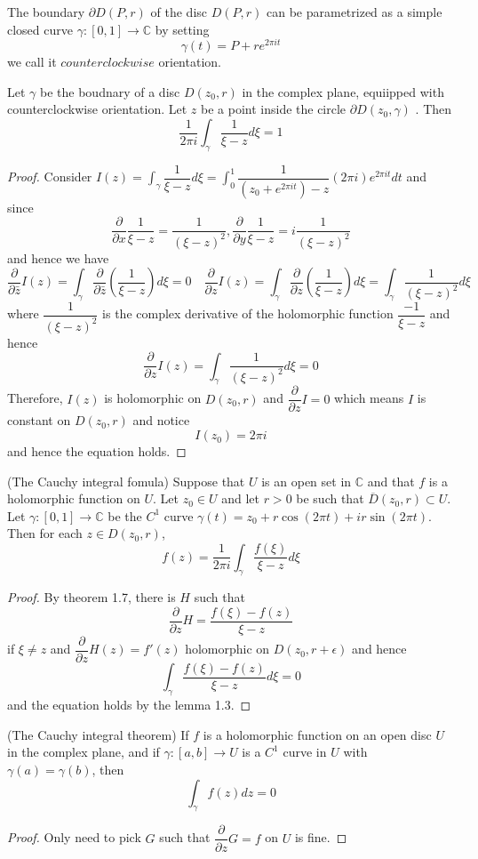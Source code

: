 \documentclass[lang=en, color=blue, ]{elegantbook}
\newcommand{\C}{\mathbb{C}}
\newcommand{\ParZ}{\dfrac{\partial}{\partial z}}
\newcommand{\ParbZ}{\dfrac{\partial}{\partial \bar{z}}}
\newcommand{\ParX}{\dfrac{\partial}{\partial x}}
\newcommand{\ParY}{\dfrac{\partial}{\partial y}}
\begin{document}
\begin{definition}
    The boundary $\partial D(P,r)$ of the disc $D(P,r)$ can be parametrized as a simple closed curve $\gamma:[0,1]\to \C$ by setting
    \[\gamma(t) = P+re^{2\pi it}\]
    we call it $counterclockwise$ orientation.
\end{definition}

\begin{lemma}
    Let $\gamma$ be the boudnary of a disc $D(z_0,r)$ in the complex plane, equiipped with counterclockwise orientation. Let $z$ be a point inside the circle $\partial D(z_0,\gamma)$ . Then
    \[\dfrac{1}{2\pi i} \int_{\gamma} \dfrac{1}{\xi-z}d\xi = 1\]
\end{lemma}
\begin{proof}\par
    Consider $I(z) = \int_{\gamma} \dfrac{1}{\xi-z}d\xi = \int_0^1 \dfrac{1}{(z_0+e^{2\pi it})-z}(2\pi i)e^{2\pi i t}dt$ and since
    \[\ParX \dfrac{1}{\xi-z} = \dfrac{1}{(\xi-z)^2}, \ParY \dfrac{1}{\xi -z} = i\dfrac{1}{(\xi-z)^2}\]
    and hence we have
    \[\ParbZ I(z) = \int_{\gamma} \ParbZ(\dfrac{1}{\xi-z})d\xi = 0\quad \ParZ I(z) = \int_{\gamma} \ParZ (\dfrac{1}{\xi-z})d\xi = \int_{\gamma}\dfrac{1}{(\xi-z)^2} d\xi\]
    where $\dfrac{1}{(\xi-z)^2}$ is the complex derivative of the holomorphic function $\dfrac{-1}{\xi-z}$ and hence 
    \[\ParZ I(z) = \int_{\gamma} \dfrac{1}{(\xi-z)^2}d\xi = 0\]
    Therefore, $I(z)$ is holomorphic on $D(z_0,r)$ and $\ParZ I = 0$ which means $I$ is constant on $D(z_0,r)$ and notice
    \[I(z_0) = 2\pi i\]
    and hence the equation holds.
\end{proof}

\begin{theorem}
    (The Cauchy integral fomula) Suppose that $U$ is an open set in $\C$ and that $f$ is a holomorphic function on $U$. Let $z_0\in U$ and let $r>0$ be such that $\overline{D}(z_0,r) \subset U$. Let $\gamma:[0,1] \to \C$ be the $C^1$ curve $\gamma(t)= z_0+r\cos(2\pi t) + ir \sin(2\pi t)$. Then for each $z\in D(z_0,r)$,
    \[f(z) = \dfrac{1}{2\pi i}\int_{\gamma} \dfrac{f(\xi)}{\xi-z}d\xi\] 
\end{theorem}
\begin{proof}
    By theorem 1.7, there is $H$ such that
    \[\ParZ H = \dfrac{f(\xi)-f(z)}{\xi-z}\]
    if $\xi \neq z$ and $\ParZ H(z) = f'(z)$ holomorphic on $D(z_0,r+\epsilon)$ and hence
    \[\int_{\gamma} \dfrac{f(\xi)-f(z)}{\xi-z}d\xi = 0\]
    and the equation holds by the lemma 1.3.
\end{proof}

\begin{theorem}
    (The Cauchy integral theorem) If $f$ is a holomorphic function on an open disc $U$ in the complex plane, and if $\gamma:[a,b] \to U$ is a $C^1$ curve in $U$ with $\gamma(a) = \gamma(b)$, then
    \[\int_{\gamma} f(z)dz = 0\]
\end{theorem}
\begin{proof}
Only need to pick $G$ such that $\ParZ G = f$ on $U$ is fine.
\end{proof}
\end{document}
